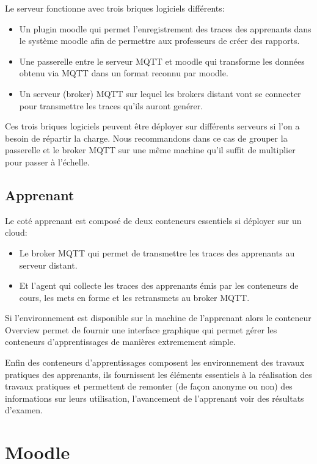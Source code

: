 \documentclass[a4paper,11pt]{report}
\begin{document}
Le serveur fonctionne avec trois briques logiciels différents:

\begin{itemize}
  \item Un plugin moodle qui permet l'enregistrement des traces des apprenants dans le système moodle afin de permettre aux professeurs de créer des rapports.
  \item Une passerelle entre le serveur MQTT et moodle qui transforme les données obtenu via MQTT dans un format reconnu par moodle.
  \item Un serveur (broker) MQTT sur lequel les brokers distant vont se connecter pour transmettre les traces qu'ils auront genérer.
\end{itemize}

Ces trois briques logiciels peuvent être déployer sur différents serveurs si l'on a besoin de répartir la charge. Nous recommandons dans ce cas de grouper la passerelle et le broker MQTT sur une même machine qu'il suffit de multiplier pour passer à l'échelle.

\subsection{Apprenant}

Le coté apprenant est composé de deux conteneurs essentiels si déployer sur un cloud:

\begin{itemize}
  \item Le broker MQTT qui permet de transmettre les traces des apprenants au serveur distant.
  \item Et l'agent qui collecte les traces des apprenants émis par les conteneurs de cours, les mets en forme et les retransmets au broker MQTT.
\end{itemize}

Si l'environnement est disponible sur la machine de l'apprenant alors le conteneur Overview permet de fournir une interface graphique qui permet gérer les conteneurs d'apprentissages de manières extremement simple.

Enfin des conteneurs d'apprentissages composent les environnement des travaux pratiques des apprenants, ils fournissent les éléments essentiels à la réalisation des travaux pratiques et permettent de remonter (de façon anonyme ou non) des informations sur leurs utilisation, l'avancement de l'apprenant voir des résultats d'examen.

\section{Moodle}
\end{document}
